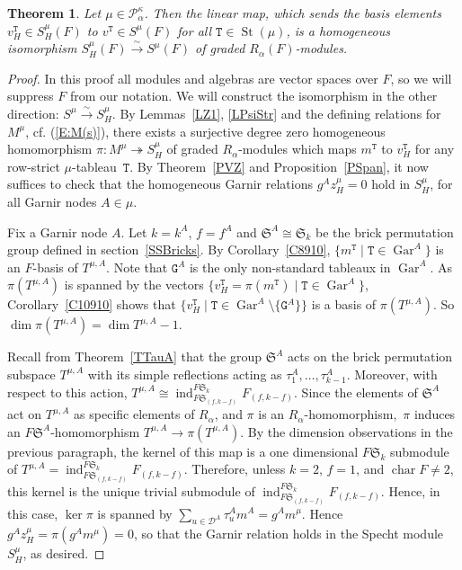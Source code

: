 \documentclass[twoside,11pt,reqno]{amsart}
\numberwithin{equation}{section}
\newtheorem{Theorem}[equation]{Theorem}
\theoremstyle{definition}  %
\newcommand{\ind}{\operatorname{ind}}
\newcommand{\cha}{\operatorname{char}}
\newcommand{\St}{\operatorname{St}}
\newcommand{\0}{{\bar 0}}
\newcommand{\1}{{\bar 1}}
\newcommand{\al}{\alpha}
\def\Si{\mathfrak{S}}
\newcommand{\D}{{\mathscr D}}
\newcommand\Par[1][]{{\mathscr P}^{\kappa#1}}
\def\T{{\mathtt T}}
\def\G{{\mathtt G}}
\def\surj{{\twoheadrightarrow}}
\def\Gar{{\operatorname{Gar}}}
\def\iso{\stackrel{\sim}{\longrightarrow}}
\begin{document}
\begin{Theorem} \label{TMain}%
Let $\mu\in\Par_\al$. Then the linear map, which sends the basis elements $v_H^\T\in S^\mu_H(F)$ to $v^\T\in S^\mu(F)$ for all $\T\in\St(\mu)$, is a homogeneous isomorphism $S^\mu_H(F)\iso S^\mu(F)$ of graded $R_\al(F)$-modules. 
\end{Theorem}
\begin{proof}
In this proof all modules and algebras are vector spaces over $F$, so we will suppress $F$ from our notation. We will construct the isomorphism in the other direction: $S^\mu\iso S^\mu_H$. 
By Lemmas~\ref{LZ1}, \ref{LPsiStr} and the defining relations for $M^\mu$, cf. (\ref{E:M(s)}), there exists a surjective degree zero homogeneous homomorphism $\pi: M^\mu\surj S^\mu_H$ of graded $R_\al$-modules which maps $m^\T$ to $v_H^\T$ for any row-strict $\mu$-tableau~$\T$.  By Theorem~\ref{PVZ} and Proposition~\ref{PSpan}, it now suffices to check that the homogeneous Garnir relations $g^Az_H^\mu=0$ hold in $S^\mu_H$, for all Garnir nodes $A\in\mu$. 

Fix a Garnir node $A$.
Let $k=k^A$, $f=f^A$ and $\Si^A\cong \Si_k$ be the brick permutation group defined in section~\ref{SSBricks}. 
By Corollary~\ref{C8910}, $\{m^\T\mid \T\in\Gar^A\}$ is an $F$-basis of $T^{\mu,A}$. Note that $\G^A$ is the only non-standard tableaux in $\Gar^A$. As $\pi(T^{\mu,A})$ is spanned by the vectors $\{v_H^\T=\pi(m^\T)\mid\T\in\Gar^A\}$, Corollary~\ref{C10910} shows that $\{v_H^\T\mid\T\in\Gar^A\setminus\{\G^A\}\}$ is a basis of $\pi(T^{\mu,A})$. So $\dim \pi(T^{\mu,A})=\dim T^{\mu,A}-1$. 

Recall from Theorem~\ref{TTauA} that the group $\Si^A$ acts on the brick permutation subspace $T^{\mu,A}$ with
its simple reflections acting as $\tau_1^A,\dots,\tau_{k-1}^A$. Moreover, with respect to this action,
$T^{\mu,A}\cong \ind_{F\Si_{(f,k-f)}}^{F\Si_k}F_{(f,k-f)}$.  Since the elements of $\Si^A$ act on $T^{\mu,A}$
as specific elements of $R_\al$, and $\pi$ is an $R_\al$-homomorphism,~$\pi$ induces an $F\Si^A$-homomorphism
$T^{\mu,A}\longrightarrow \pi(T^{\mu,A})$. By the dimension observations in the previous paragraph, the
kernel of this map is a one dimensional $F\Si_k$ submodule of
$T^{\mu,A}=\ind_{F\Si_{(f,k-f)}}^{F\Si_k}F_{(f,k-f)}$. Therefore, unless $k=2$, $f=1$, and $\cha F\neq 2$,
this kernel is the unique trivial submodule of $\ind_{F\Si_{(f,k-f)}}^{F\Si_k}F_{(f,k-f)}$. Hence, in this
case, $\ker\pi$ is spanned by $\sum_{u\in \D^A}\tau_u^Am^A=g^Am^\mu$. Hence $g^Az_H^\mu=\pi(g^Am^\mu)=0$, so that
the Garnir relation holds in the Specht module $S^\mu_H$, as desired. 


\end{proof}
\end{document}
